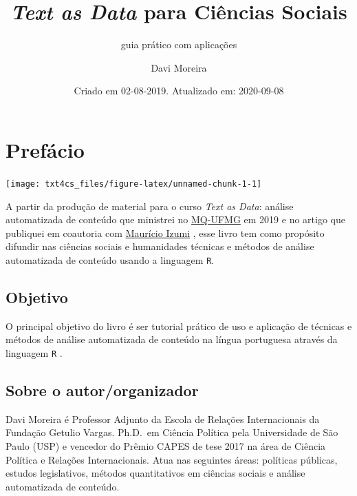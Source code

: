 \documentclass[]{book}
\title{\emph{Text as Data} para Ciências Sociais}
\subtitle{guia prático com aplicações}
\author{Davi Moreira}
\date{Criado em 02-08-2019. Atualizado em: 2020-09-08}
\begin{document}
\maketitle

{
\hypersetup{linkcolor=}
\setcounter{tocdepth}{1}
\tableofcontents
}
\hypertarget{prefuxe1cio}{%
\chapter*{Prefácio}\label{prefuxe1cio}}

\begin{center}\texttt{[image: txt4cs\_files/figure-latex/unnamed-chunk-1-1]} \end{center}

A partir da produção de material para o curso \emph{Text as Data}: análise automatizada de conteúdo que ministrei no \href{http://www.fafich.ufmg.br/~mq/}{MQ-UFMG} em 2019 e no artigo que publiquei em coautoria com \href{http://lattes.cnpq.br/2546701843557096}{Maurício Izumi} \citep{izumi_o_2018}, esse livro tem como propósito difundir nas ciências sociais e humanidades técnicas e métodos de análise automatizada de conteúdo usando a linguagem \texttt{R}.

\hypertarget{objetivo}{%
\section*{Objetivo}\label{objetivo}}

O principal objetivo do livro é ser tutorial prático de uso e aplicação de técnicas e métodos de análise automatizada de conteúdo na língua portuguesa através da linguagem \texttt{R} .

\hypertarget{sobre-o-autororganizador}{%
\section*{Sobre o autor/organizador}\label{sobre-o-autororganizador}}

Davi Moreira é Professor Adjunto da Escola de Relações Internacionais da Fundação Getulio Vargas. Ph.D.~em Ciência Política pela Universidade de São Paulo (USP) e vencedor do Prêmio CAPES de tese 2017 na área de Ciência Política e Relações Internacionais. Atua nas seguintes áreas: políticas públicas, estudos legislativos, métodos quantitativos em ciências sociais e análise automatizada de conteúdo.
\end{document}
